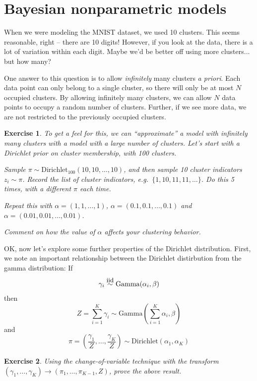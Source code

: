 \documentclass[twoside]{article}
\newcounter{lecnum}
\newtheorem{exercise}{Exercise}[lecnum]
\begin{document}
 \section{Bayesian nonparametric models}

 When we were modeling the MNIST dataset, we used 10 clusters. This seems reasonable, right -- there are 10 digits! However, if you look at the data, there is a lot of variation within each digit. Maybe we'd be better off using more clusters... but how many?

 One answer to this question is to allow \textit{infinitely} many clusters \textit{a priori}. Each data point can only belong to a single cluster, so there will only be at most $N$ occupied clusters. By allowing infinitely many clusters, we can allow $N$ data points to occupy a random number of clusters. Further, if we see more data, we are not restricted to the previously occupied clusters.

 \begin{exercise}

   To get a feel for this, we can ``approximate'' a model with infinitely many clusters with a model with a large number of clusters. Let's start with a Dirichlet prior on cluster membership, with 100 clusters.

   Sample $\pi\sim \mbox{Dirichlet}_{100}(10,10,\dots,10)$, and then sample 10 cluster indicators $z_i\sim \pi$. Record the list of cluster indicators, e.g.\ $\{1,10,11,11,\dots\}$. Do this 5 times, with a different $\pi$ each time.

   Repeat this with $\alpha = (1,1,\dots,1)$, $\alpha = (0.1,0.1,\dots,0.1)$ and $\alpha=(0.01,0.01,\dots,0.01)$.

   Comment on how the value of $\alpha$ affects your clustering behavior.
 \end{exercise}

   OK, now let's explore some further properties of the Dirichlet distribution. First, we note an important relationship between the Dirichlet distirbution from the gamma distribution: If
   $$\gamma_i \stackrel{\mbox{\small{iid}}}{\sim}\mbox{Gamma}(\alpha_i,\beta)$$
   then
   $$Z = \sum_{i=1}^K \gamma_i \sim \mbox{Gamma}\left(\sum_{i=1}^K\alpha_i,\beta\right)$$
   and
   $$\pi = \left(\frac{\gamma_1}{Z},\dots,\frac{\gamma_K}{Z}\right)\sim \mbox{Dirichlet}(\alpha_1,\alpha_K)$$

   \begin{exercise}
     Using the change-of-variable technique with the transform $(\gamma_1,\dots,\gamma_K)\rightarrow (\pi_1,\dots, \pi_{K-1},Z)$, prove the above result.
   \end{exercise}
\end{document}
